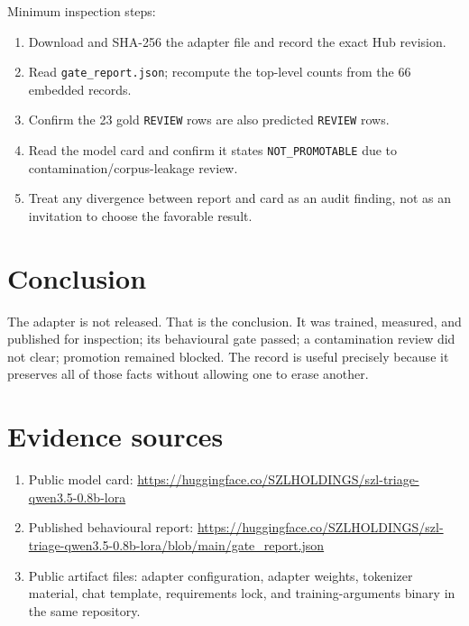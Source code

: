 \documentclass[10pt,letterpaper]{article}
\newcommand{\blocked}{\texttt{NOT\_PROMOTABLE}}
\newcommand{\review}{\texttt{REVIEW}}
\begin{document}
Minimum inspection steps:
\begin{enumerate}[leftmargin=1.4em]
\item Download and SHA-256 the adapter file and record the exact Hub revision.
\item Read \texttt{gate\_report.json}; recompute the top-level counts from the 66 embedded records.
\item Confirm the 23 gold \review{} rows are also predicted \review{} rows.
\item Read the model card and confirm it states \blocked{} due to contamination/corpus-leakage review.
\item Treat any divergence between report and card as an audit finding, not as an invitation to choose the favorable result.
\end{enumerate}

\section{Conclusion}
The adapter is not released. That is the conclusion. It was trained, measured, and published for inspection; its behavioural gate passed; a contamination review did not clear; promotion remained blocked. The record is useful precisely because it preserves all of those facts without allowing one to erase another.

\appendix
\section{Evidence sources}
\begin{enumerate}[leftmargin=1.4em]
\item Public model card: \url{https://huggingface.co/SZLHOLDINGS/szl-triage-qwen3.5-0.8b-lora}
\item Published behavioural report: \url{https://huggingface.co/SZLHOLDINGS/szl-triage-qwen3.5-0.8b-lora/blob/main/gate_report.json}
\item Public artifact files: adapter configuration, adapter weights, tokenizer material, chat template, requirements lock, and training-arguments binary in the same repository.
\end{enumerate}
\end{document}
